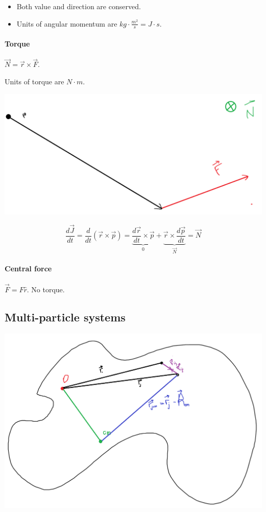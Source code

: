 \begin{itemize}
	\item Both value and direction are conserved.
	\item Units of angular momentum are $kg \cdot \frac{m^2}{s} = J \cdot s$.
\end{itemize}

\paragraph{Torque} $\vec{N} = \vec{r} \times \vec{F}$.

Units of torque are $N \cdot m$.

\begin{center}
	\includegraphics[width=0.5\linewidth]{./lect14/pic1.png}
\end{center}

$$\frac{d\vec{J}}{dt} = \frac{d}{dt}\left(\vec{r} \times \vec{p}\right) = \underbrace{\frac{d\vec{r}}{dt} \times \vec{p}}_{0} + \underbrace{\vec{r} \times \frac{d\vec{p}}{dt}}_{\vec{N}}=\vec{N}$$

\paragraph{Central force} $\vec{F} =  F \hat{r}$. No torque.

\subsection{Multi-particle systems}
\begin{center}
	\includegraphics[width=0.8\linewidth]{./lect14/pic2.png}
\end{center}


